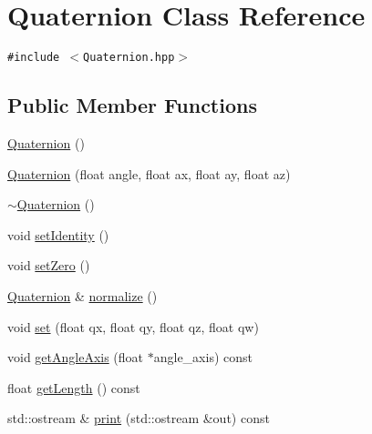\hypertarget{classm3g_1_1Quaternion}{
\section{Quaternion Class Reference}
\label{classm3g_1_1Quaternion}
}
{\tt \#include $<$Quaternion.hpp$>$}

\subsection*{Public Member Functions}
\begin{CompactItemize}
\item 
\hyperlink{classm3g_1_1Quaternion_65ed15cc19af958b5933b5c522f10e66}{Quaternion} ()
\item 
\hyperlink{classm3g_1_1Quaternion_7a06a28b864e525f73a1bb0eb3e9274e}{Quaternion} (float angle, float ax, float ay, float az)
\item 
\hyperlink{classm3g_1_1Quaternion_6e9a147677b9ffd583c59e9d06c3d938}{$\sim$Quaternion} ()
\item 
void \hyperlink{classm3g_1_1Quaternion_382e6ad7e6721b121e510959e1011be3}{setIdentity} ()
\item 
void \hyperlink{classm3g_1_1Quaternion_47affd1a10b589811fc4828c1a2e0c6d}{setZero} ()
\item 
\hyperlink{classm3g_1_1Quaternion}{Quaternion} \& \hyperlink{classm3g_1_1Quaternion_c9cc178bcc449e08499113c35feb2a2b}{normalize} ()
\item 
void \hyperlink{classm3g_1_1Quaternion_0712dc357557a30ac0da0a9d4cdd278c}{set} (float qx, float qy, float qz, float qw)
\item 
void \hyperlink{classm3g_1_1Quaternion_3049675269aef6bb333d8f83fdf6eed7}{getAngleAxis} (float $\ast$angle\_\-axis) const 
\item 
float \hyperlink{classm3g_1_1Quaternion_b4393f1928cea2a3baadbf9acdd99de2}{getLength} () const 
\item 
std::ostream \& \hyperlink{classm3g_1_1Quaternion_6fea17fa1532df3794f8cb39cb4f911f}{print} (std::ostream \&out) const 
\end{CompactItemize}
